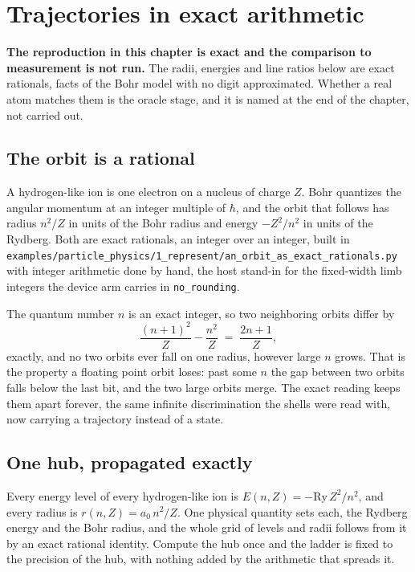 \chapter{Trajectories in exact arithmetic}

\textbf{The reproduction in this chapter is exact and the comparison to measurement is not run.} The
radii, energies and line ratios below are exact rationals, facts of the Bohr model with no digit
approximated. Whether a real atom matches them is the oracle stage, and it is named at the end of the
chapter, not carried out.

\section{The orbit is a rational}

A hydrogen-like ion is one electron on a nucleus of charge $Z$. Bohr quantizes the angular momentum
at an integer multiple of $\hbar$, and the orbit that follows has radius $n^2/Z$ in units of the Bohr
radius and energy $-Z^2/n^2$ in units of the Rydberg. Both are exact rationals, an integer over an
integer, built in
\texttt{examples/\allowbreak{}particle\_physics/\allowbreak{}1\_represent/\allowbreak{}an\_orbit\_as\_exact\_rationals.py}
with integer arithmetic done by hand, the host stand-in for the fixed-width limb integers the device
arm carries in \texttt{no\_rounding}.

The quantum number $n$ is an exact integer, so two neighboring orbits differ by
\[
\frac{(n+1)^2}{Z} - \frac{n^2}{Z} \;=\; \frac{2n+1}{Z},
\]
exactly, and no two orbits ever fall on one radius, however large $n$ grows. That is the property a
floating point orbit loses: past some $n$ the gap between two orbits falls below the last bit, and the
two large orbits merge. The exact reading keeps them apart forever, the same infinite
discrimination the shells were read with, now carrying a trajectory instead of a state.

\section{One hub, propagated exactly}

Every energy level of every hydrogen-like ion is $E(n, Z) = -\mathrm{Ry}\, Z^2/n^2$, and every radius
is $r(n, Z) = a_0\, n^2/Z$. One physical quantity sets each, the Rydberg energy and the Bohr radius,
and the whole grid of levels and radii follows from it by an exact rational identity. Compute the hub
once and the ladder is fixed to the precision of the hub, with nothing added by the arithmetic that
spreads it.

